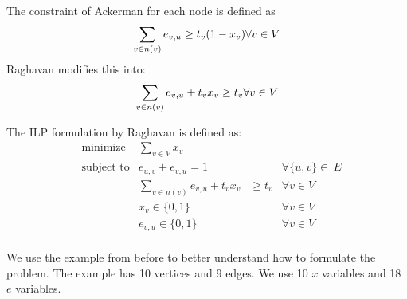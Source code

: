 The constraint of Ackerman\cite{combi} for each node is defined as 
\begin{equation}
 \sum_{v\in n(v)} e_{v,u}\geq t_{v}(1-x_{v})  \forall v \in V\\
\end{equation}
Raghavan modifies this into:
\begin{equation}
\sum_{v\in n(v)} e_{v,u} + t_{v} x_{v} \geq t_{v}  \forall v \in V\\
\end{equation}

The ILP formulation by Raghavan\cite{wtss} is defined as:
\begin{equation*}
	\begin{aligned}
	& {\text{minimize}}&\sum_{v\in V}{x_{v}}\\ 
	&\text{subject to} & e_{u,v}+e_{v,u}=1  &&\forall\{u,v\}\in\ E \\
	& & \sum_{v\in n(v)} e_{v,u} + t_{v} x_{v}& \geq t_{v} & \forall v \in V\\
	& &x_{v} \in \{0,1\}  & & \forall v \in V\\
	& &e_{v,u}\in \{0,1\}  & & \forall v \in V\\
	\end{aligned}
\end{equation*}

We use the example from before to better understand how to formulate the problem. The example has 10 vertices and 9 edges. We use 10 $x$ variables and 18 $e$ variables. 

